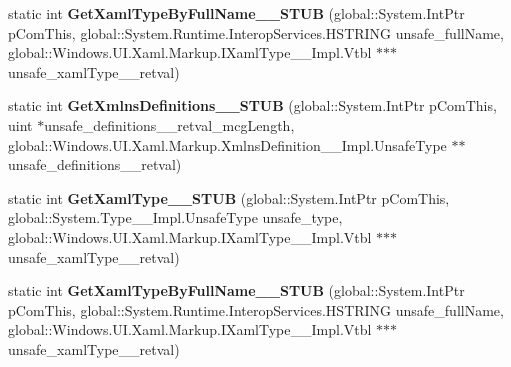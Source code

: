 \begin{DoxyCompactItemize}
\item 
\mbox{\label{struct_windows_1_1_u_i_1_1_xaml_1_1_markup_1_1_i_xaml_metadata_provider_____impl_1_1_vtbl_a5963d1e625e7b53afbf68b97f7bcf391}} 
static int {\bfseries Get\+Xaml\+Type\+By\+Full\+Name\+\_\+\+\_\+\+S\+T\+UB} (global\+::\+System.\+Int\+Ptr p\+Com\+This, global\+::\+System.\+Runtime.\+Interop\+Services.\+H\+S\+T\+R\+I\+NG unsafe\+\_\+full\+Name, global\+::\+Windows.\+U\+I.\+Xaml.\+Markup.\+I\+Xaml\+Type\+\_\+\+\_\+\+Impl.\+Vtbl $\ast$$\ast$$\ast$unsafe\+\_\+xaml\+Type\+\_\+\+\_\+retval)
\item 
\mbox{\label{struct_windows_1_1_u_i_1_1_xaml_1_1_markup_1_1_i_xaml_metadata_provider_____impl_1_1_vtbl_a537d03a4b931eb3d50583ba33bccdbea}} 
static int {\bfseries Get\+Xmlns\+Definitions\+\_\+\+\_\+\+S\+T\+UB} (global\+::\+System.\+Int\+Ptr p\+Com\+This, uint $\ast$unsafe\+\_\+definitions\+\_\+\+\_\+retval\+\_\+mcg\+Length, global\+::\+Windows.\+U\+I.\+Xaml.\+Markup.\+Xmlns\+Definition\+\_\+\+\_\+\+Impl.\+Unsafe\+Type $\ast$$\ast$unsafe\+\_\+definitions\+\_\+\+\_\+retval)
\item 
\mbox{\label{struct_windows_1_1_u_i_1_1_xaml_1_1_markup_1_1_i_xaml_metadata_provider_____impl_1_1_vtbl_a2cfb95c2a77a88a14f48b5cd9d709cc9}} 
static int {\bfseries Get\+Xaml\+Type\+\_\+\+\_\+\+S\+T\+UB} (global\+::\+System.\+Int\+Ptr p\+Com\+This, global\+::\+System.\+Type\+\_\+\+\_\+\+Impl.\+Unsafe\+Type unsafe\+\_\+type, global\+::\+Windows.\+U\+I.\+Xaml.\+Markup.\+I\+Xaml\+Type\+\_\+\+\_\+\+Impl.\+Vtbl $\ast$$\ast$$\ast$unsafe\+\_\+xaml\+Type\+\_\+\+\_\+retval)
\item 
\mbox{\label{struct_windows_1_1_u_i_1_1_xaml_1_1_markup_1_1_i_xaml_metadata_provider_____impl_1_1_vtbl_a5963d1e625e7b53afbf68b97f7bcf391}} 
static int {\bfseries Get\+Xaml\+Type\+By\+Full\+Name\+\_\+\+\_\+\+S\+T\+UB} (global\+::\+System.\+Int\+Ptr p\+Com\+This, global\+::\+System.\+Runtime.\+Interop\+Services.\+H\+S\+T\+R\+I\+NG unsafe\+\_\+full\+Name, global\+::\+Windows.\+U\+I.\+Xaml.\+Markup.\+I\+Xaml\+Type\+\_\+\+\_\+\+Impl.\+Vtbl $\ast$$\ast$$\ast$unsafe\+\_\+xaml\+Type\+\_\+\+\_\+retval)
$$
\end{DoxyCompactItemize}
